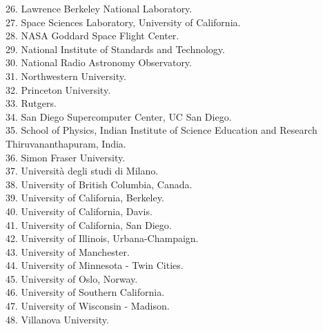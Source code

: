 \documentclass[PICOReport.tex]{subfiles}
\begin{document}
\begin{multicols}{2}
{26. Lawrence Berkeley National Laboratory.  \\
27. Space Sciences Laboratory, University of California.  \\
28. NASA Goddard Space Flight Center.  \\
29. National Institute of Standards and Technology.  \\
30. National Radio Astronomy Observatory.  \\
31. Northwestern University.  \\
32. Princeton University.  \\
33. Rutgers.  \\
34. San Diego Supercomputer Center, UC San Diego.  \\
35. School of Physics, Indian Institute of Science Education and Research Thiruvananthapuram,  India.  \\
36. Simon Fraser University.  \\
37. Universit\`a degli studi di Milano.  \\
38. University of British Columbia, Canada.  \\
39. University of California, Berkeley.  \\
40. University of California, Davis.  \\
41. University of California, San Diego.  \\
42. University of Illinois, Urbana-Champaign.  \\
43. University of Manchester.  \\
44. University of Minnesota - Twin Cities.  \\
45. University of Oslo, Norway.  \\
46. University of Southern California.  \\
47. University of Wisconsin - Madison.  \\
48. Villanova University.  \\
}
\end{multicols}
\end{document}
